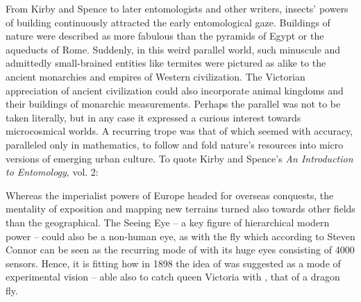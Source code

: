 {From Kirby and Spence to later entomologists and other writers, insects'
powers of building continuously attracted the early entomological gaze.
Buildings of nature were described as more fabulous than the pyramids
of Egypt or the aqueducts of Rome. Suddenly, in this weird parallel
world, such minuscule and admittedly small{}-brained entities like
termites were pictured as alike to the ancient monarchies and empires
of Western civilization. The Victorian appreciation of ancient
civilization could also incorporate animal kingdoms and their buildings
of monarchic measurements. Perhaps the parallel was not to be taken
literally, but in any case it expressed a curious interest towards
microcosmical worlds. A recurring trope was that of 
which seemed with accuracy, paralleled only in mathematics, to follow
and fold nature's resources into micro versions of emerging urban
culture. To quote Kirby and Spence's {\em An Introduction to
Entomology}, vol. 2:


Whereas the imperialist powers of Europe headed for overseas conquests,
the mentality of exposition and mapping new terrains turned also
towards other fields than the geographical. The Seeing Eye {--} a key
figure of hierarchical modern power {--} could also be a non{}-human
eye, as with the fly which according to Steven Connor can be seen as
the recurring mode of  with its huge eyes consisting of 4000 sensors. Hence, it is
fitting how in 1898 the idea of  was
suggested as a mode of experimental vision {--} able also to catch
queen Victoria with ,
that of a dragon fly. 

}
